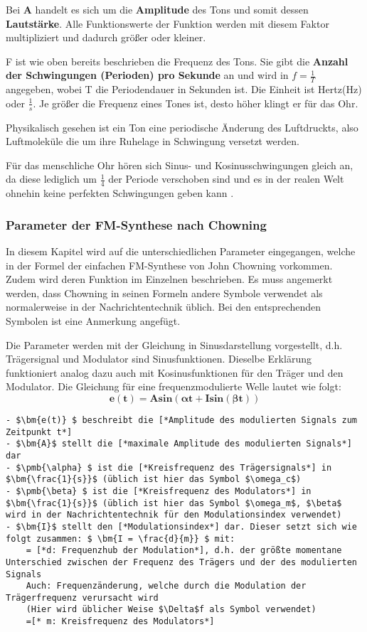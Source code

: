 Bei $\bm{A}$ handelt es sich um die \textbf{Amplitude} des Tons und somit dessen \textbf{Lautstärke}. Alle Funktionswerte der Funktion werden mit diesem Faktor multipliziert und dadurch größer oder kleiner.

F ist wie oben bereits beschrieben die Frequenz des Tons. Sie gibt die \textbf{Anzahl der Schwingungen (Perioden) pro Sekunde} an und wird in $f=\frac{1}{T}$ angegeben, wobei T die Periodendauer in Sekunden ist. Die Einheit ist Hertz(Hz) oder $\frac{1}{s}$.
Je größer die Frequenz eines Tones ist, desto höher klingt er für das Ohr.

Physikalisch gesehen ist ein Ton eine periodische Änderung des Luftdruckts, also Luftmoleküle die um ihre Ruhelage in Schwingung versetzt werden\cite[s. 111 f.]{zwicker}. 

Für das menschliche Ohr hören sich Sinus- und Kosinusschwingungen gleich an, da diese lediglich um $\frac{1}{4}$ der Periode verschoben sind und es in der realen Welt ohnehin keine perfekten Schwingungen geben kann \cite[s. 3f.]{zwicker}. 
\subsubsection{Parameter der FM-Synthese nach Chowning}
\label{chowningparameter}

In diesem Kapitel wird auf die unterschiedlichen Parameter eingegangen, welche in der Formel der einfachen FM-Synthese von John Chowning vorkommen. Zudem wird deren Funktion im Einzelnen beschrieben. Es muss angemerkt werden, dass Chowning in seinen Formeln andere Symbole verwendet als normalerweise in der Nachrichtentechnik üblich. Bei den entsprechenden Symbolen ist eine Anmerkung angefügt.

Die Parameter werden mit der Gleichung in Sinusdarstellung vorgestellt, d.h. Trägersignal und Modulator sind Sinusfunktionen. Dieselbe Erklärung funktioniert analog dazu auch mit Kosinusfunktionen für den Träger und den Modulator.
Die Gleichung für eine frequenzmodulierte Welle lautet wie folgt:
\[ \bm{e(t) = A sin(\pmb{\alpha} t + I sin(\pmb{\beta} t))} \]

\begin{lstlisting}[mathescape]
- $\bm{e(t)} $ beschreibt die [*Amplitude des modulierten Signals zum Zeitpunkt t*]
- $\bm{A}$ stellt die [*maximale Amplitude des modulierten Signals*] dar
- $\pmb{\alpha} $ ist die [*Kreisfrequenz des Trägersignals*] in $\bm{\frac{1}{s}}$ (üblich ist hier das Symbol $\omega_c$)
- $\pmb{\beta} $ ist die [*Kreisfrequenz des Modulators*] in $\bm{\frac{1}{s}}$ (üblich ist hier das Symbol $\omega_m$, $\beta$ wird in der Nachrichtentechnik für den Modulationsindex verwendet)
- $\bm{I}$ stellt den [*Modulationsindex*] dar. Dieser setzt sich wie folgt zusammen: $ \bm{I = \frac{d}{m}} $ mit:
	= [*d: Frequenzhub der Modulation*], d.h. der größte momentane Unterschied zwischen der Frequenz des Trägers und der des modulierten Signals
	Auch: Frequenzänderung, welche durch die Modulation der Trägerfrequenz verursacht wird
	(Hier wird üblicher Weise $\Delta$f als Symbol verwendet)
	=[* m: Kreisfrequenz des Modulators*]
\end{lstlisting} \cite{chowningPaper}

